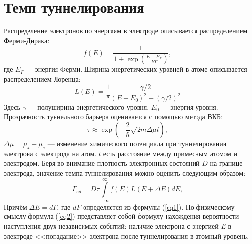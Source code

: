 \documentclass[12pt,a4paper]{report}
\begin{document}
\section*{Темп туннелирования}
Распределение электронов по энергиям в электроде описывается
распределением Ферми-Дирака:
\begin{equation}
f(E)= \frac{1}{1+\exp(\frac{E-E_F}{kT})},
\end{equation}
где $E_F$ — энергия Ферми.
Ширина энергетических уровней в атоме описывается распределением Лоренца:
\begin{equation}
L(E)=\frac{1}{\pi}\frac{\gamma/2}{(E-E_0)^2+(\gamma/2)^2}
\end{equation}
Здесь $\gamma$ — полуширина энергетического уровня. $E_0$ — энергия уровня. Прозрачность туннельного барьера оценивается с помощью метода ВКБ:
\begin{equation}
\tau \approx \exp(-\frac{2}{\hbar}\sqrt{2m\Delta\mu}l),
\end{equation}
$\Delta\mu = \mu_d - \mu_e$ — изменение химического потенциала при туннелировании электрона с электрода на атом. $l$ есть расстояние между примесным атомом и электродом. Беря во внимание плотность электронных состояний $D$ на границе электрода, значение темпа туннелирования можно оценить следующим образом:
\begin{equation}\label{eq2}
\Gamma_{ed} = D\tau \int\limits_{-\infty}^{\infty}f(E)L(E + \Delta E) dE,
\end{equation} 
Причём $\Delta E = dF$, где $dF$ определяется из формулы (\ref{eq1}).
По физическому смыслу формула (\ref{eq2}) представляет собой формулу нахождения вероятности наступления двух независимых событий: наличие электрона с энергией $E$ в электроде <<попадание>> электрона после туннелирования в атомный уровень.
\end{document}

